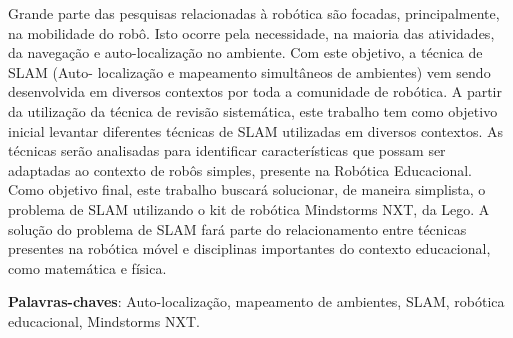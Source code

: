 \begin{resumo}
 
 	Grande parte das pesquisas relacionadas à robótica são focadas, principalmente, na mobilidade do robô. Isto ocorre pela necessidade, na maioria das atividades, da
navegação e auto-localização no ambiente. Com este objetivo, a técnica de SLAM (Auto-
localização e mapeamento simultâneos de ambientes) vem sendo desenvolvida em diversos
contextos por toda a comunidade de robótica. A partir da utilização da técnica
de revisão sistemática, este trabalho tem como objetivo inicial levantar diferentes técnicas
de SLAM utilizadas em diversos contextos. As técnicas serão analisadas para identificar características que possam ser adaptadas ao contexto de robôs simples, presente na Robótica Educacional. Como objetivo final, este trabalho buscará solucionar, de maneira simplista, o problema de SLAM utilizando o kit de robótica Mindstorms NXT, da Lego. A solução do problema de SLAM fará parte do relacionamento entre técnicas presentes na robótica móvel e disciplinas importantes do contexto educacional, como matemática e física.

 \vspace{\onelineskip}
    
 \noindent
 \textbf{Palavras-chaves}: Auto-localização, mapeamento de ambientes, SLAM, robótica educacional, Mindstorms NXT.
\end{resumo}

